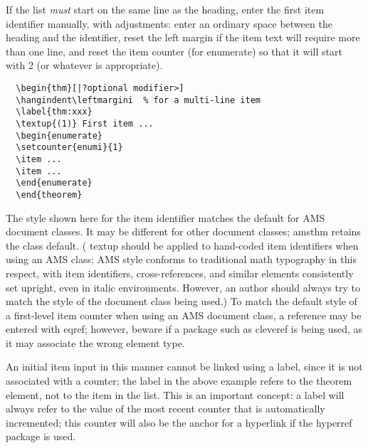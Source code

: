 \documentclass[11pt,twoside]{article}
\newcommand{\ntt}{%
  \fontfamily\ttdefault \fontseries\mddefault \fontshape\updefault
  \selectfont
}
\DeclareRobustCommand{\cn}[1]{{\ntt\bslchar#1}}
\DeclareRobustCommand{\pkg}[1]{{\ntt#1}}
\DeclareRobustCommand{\env}[1]{{\ntt#1}}
\begin{document}
If the list \emph{must} start on the same line as the heading, enter
the first item identifier manually, with adjustments: enter an
ordinary space between the heading and the identifier, reset the left
margin if the item text will require more than one line, and reset
the item counter (for \env{enumerate}) so that it will start
with 2 (or whatever is appropriate).
\begin{verbatim}
  \begin{thm}[|?optional modifier>]
  \hangindent\leftmargini  % for a multi-line item
  \label{thm:xxx}
  \textup{(1)} First item ...
  \begin{enumerate}
  \setcounter{enumi}{1}
  \item ...
  \item ...
  \end{enumerate}
  \end{theorem}
\end{verbatim}
The style shown here for the item identifier matches the default for
AMS document classes.  It may be different for other document classes;
\pkg{amsthm} retains the class default.  (\cn{textup} should be
applied to hand-coded item identifiers when using an AMS class; AMS
style conforms to traditional math typography in this respect, with item
identifiers, cross-references, and similar elements consistently set
upright, even in italic environments.  However, an author should always
try to match the style of the document class being used.)  To match the
default style of a first-level item counter when using an AMS document
class, a reference may be entered with \cn{eqref}; however, beware if
a package such as \pkg{cleveref} is being used, as it may associate the
wrong element type.

An initial item input in this manner cannot be linked using a \cn{label},
since it is not associated with a counter; the \cn{label} in the above
example refers to the theorem element, not to the item in the list.
This is an important concept: a \cn{label} will always refer to the
value of the most recent counter that is automatically incremented;
this counter will also be the anchor for a hyperlink if the
\pkg{hyperref} package is used.




\enlargethispage{1\baselineskip} %
\end{document}
